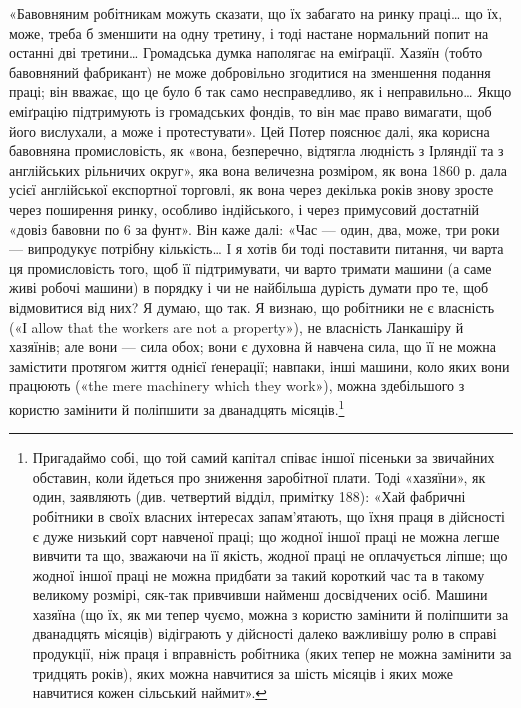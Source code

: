«Бавовняним робітникам можуть сказати, що їх забагато на
ринку праці\dots{} що їх, може, треба б зменшити на одну третину,
і тоді настане нормальний попит на останні дві третини\dots{} Громадська
думка наполягає на еміґрації. Хазяїн (тобто бавовняний
фабрикант) не може добровільно згодитися на зменшення подання
праці; він вважає, що це було б так само несправедливо, як
і неправильно\dots{} Якщо еміґрацію підтримують із громадських
фондів, то він має право вимагати, щоб його вислухали, а може
і протестувати». Цей Потер пояснює далі, яка корисна бавовняна
промисловість, як «вона, безперечно, відтягла людність з Ірляндії
та з англійських рільничих округ», яка вона величезна розміром,
як вона 1860 р. дала  усієї англійської експортної
торговлі, як вона через декілька років знову зросте через поширення
ринку, особливо індійського, і через примусовий достатній
«довіз бавовни по 6 за фунт». Він каже далі: «Час — один,
два, може, три роки — випродукує потрібну кількість\dots{} І я хотів би
тоді поставити питання, чи варта ця промисловість того, щоб її
підтримувати, чи варто тримати машини (а саме живі робочі
машини) в порядку і чи не найбільша дурість думати про те, щоб
відмовитися від них? Я думаю, що так. Я визнаю, що робітники
не є власність («І allow that the workers are not a property»),
не власність Ланкашіру й хазяїнів; але вони — сила обох; вони
є духовна й навчена сила, що її не можна замістити протягом
життя однієї ґенерації; навпаки, інші машини, коло яких вони
працюють («the mere machinery which they work»), можна здебільшого
з користю замінити й поліпшити за дванадцять місяців.\footnote{
Пригадаймо собі, що той самий капітал співає іншої пісеньки за
звичайних обставин, коли йдеться про зниження заробітної плати. Тоді
«хазяїни», як один, заявляють (див. четвертий відділ, примітку 188):
«Хай фабричні робітники в своїх власних інтересах запам’ятають, що їхня
праця в дійсності є дуже низький сорт навченої праці; що жодної іншої
праці не можна легше вивчити та що, зважаючи на її якість, жодної
праці не оплачується ліпше; що жодної іншої праці не можна придбати
за такий короткий час та в такому великому розмірі, сяк-так привчивши
найменш досвідчених осіб. Машини хазяїна (що їх, як ми тепер
чуємо, можна з користю замінити й поліпшити за дванадцять місяців)
відіграють у дійсності далеко важливішу ролю в справі продукції, ніж
праця і вправність робітника (яких тепер не можна замінити за тридцять
років), яких можна навчитися за шість місяців і яких може навчитися
кожен сільський наймит».
}
